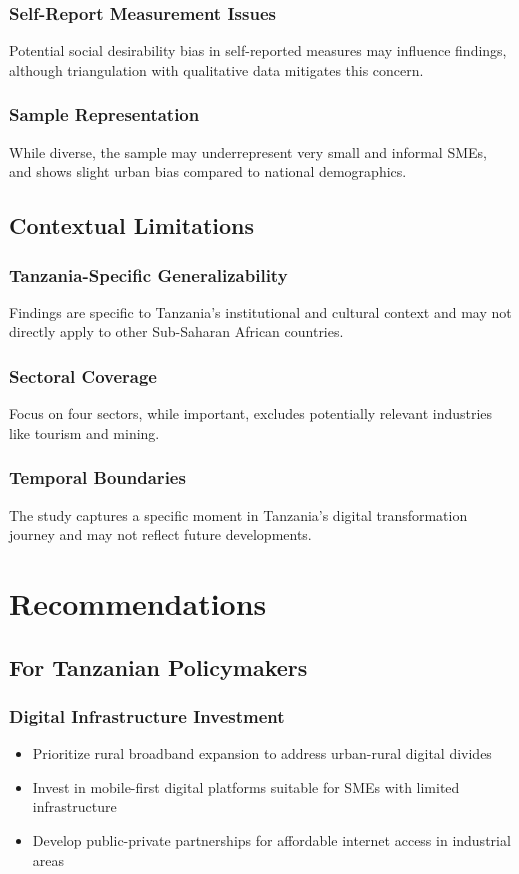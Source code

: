 \subsubsection{Self-Report Measurement Issues}
Potential social desirability bias in self-reported measures may influence findings, although triangulation with qualitative data mitigates this concern.

\subsubsection{Sample Representation}
While diverse, the sample may underrepresent very small and informal SMEs, and shows slight urban bias compared to national demographics.

\subsection{Contextual Limitations}

\subsubsection{Tanzania-Specific Generalizability}
Findings are specific to Tanzania's institutional and cultural context and may not directly apply to other Sub-Saharan African countries.

\subsubsection{Sectoral Coverage}
Focus on four sectors, while important, excludes potentially relevant industries like tourism and mining.

\subsubsection{Temporal Boundaries}
The study captures a specific moment in Tanzania's digital transformation journey and may not reflect future developments.

\section{Recommendations}

\subsection{For Tanzanian Policymakers}

\subsubsection{Digital Infrastructure Investment}
\begin{itemize}
    \item Prioritize rural broadband expansion to address urban-rural digital divides
    \item Invest in mobile-first digital platforms suitable for SMEs with limited infrastructure
    \item Develop public-private partnerships for affordable internet access in industrial areas
\end{itemize}

